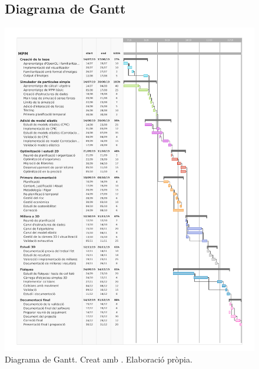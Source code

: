 \documentclass[a4paper]{report}
\begin{document}
	\newpage

	\begin{figure}[H]
	\subsection{Diagrama de Gantt}
		\includegraphics[width=1.45\textwidth,center]{images/Gantt.pdf}%
		\caption{Diagrama de Gantt. Creat amb \cite{Teamgantt2019}. Elaboració pròpia.}
		\label{fig:Gantt}
	\end{figure}
\end{document}
